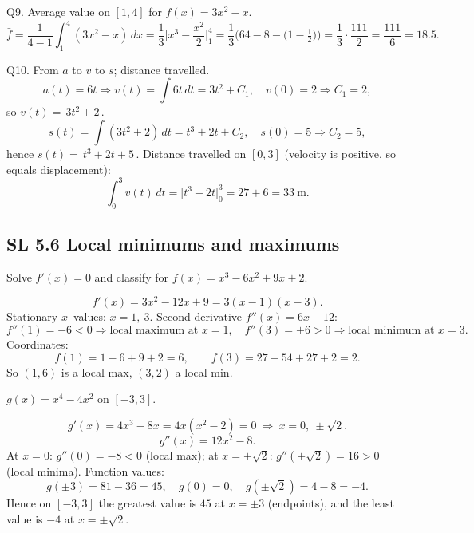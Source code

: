 \documentclass[11pt]{article}
\def\textbf#1{#1}%
\newcommand{\tocsubsection}[1]{\subsection{#1}}
\begin{document}
\begin{solution}
\textbf{Q9. Average value on $[1,4]$ for $f(x)=3x^{2}-x$.}
\[
\bar f=\frac{1}{4-1}\int_{1}^{4}(3x^{2}-x)\,dx
=\frac{1}{3}\Big[x^{3}-\frac{x^{2}}{2}\Big]_{1}^{4}
=\frac{1}{3}\Big(64-8-\big(1-\tfrac12\big)\Big)
=\frac{1}{3}\cdot\frac{111}{2}=\boxed{\frac{111}{6}}= \boxed{18.5}.
\]
\end{solution}

\begin{solution}
\textbf{Q10. From $a$ to $v$ to $s$; distance travelled.}
\[
a(t)=6t \Rightarrow v(t)=\int 6t\,dt=3t^{2}+C_1,\quad v(0)=2\Rightarrow C_1=2,
\]
so $v(t)=\boxed{\,3t^{2}+2\,}$.  
\[
s(t)=\int (3t^{2}+2)\,dt=t^{3}+2t+C_2,\quad s(0)=5\Rightarrow C_2=5,
\]
hence $s(t)=\boxed{\,t^{3}+2t+5\,}$.  
Distance travelled on $[0,3]$ (velocity is positive, so equals displacement):
\[
\int_{0}^{3} v(t)\,dt=\Big[t^{3}+2t\Big]_{0}^{3}=27+6=\boxed{33\ \text{m}}.
\]
\end{solution}



\tocsubsection{SL 5.6 Local minimums and maximums}


\begin{solution}
\textbf{Solve $f'(x)=0$ and classify for $f(x)=x^{3}-6x^{2}+9x+2$.}

\[
f'(x)=3x^{2}-12x+9=3(x-1)(x-3).
\]
Stationary $x$–values: $\boxed{x=1,\ 3}$.  
Second derivative $f''(x)=6x-12$:
\[
f''(1)=-6<0\Rightarrow \text{local maximum at }x=1,\quad
f''(3)=+6>0\Rightarrow \text{local minimum at }x=3.
\]
Coordinates:
\[
f(1)=1-6+9+2= \boxed{6},\qquad f(3)=27-54+27+2=\boxed{2}.
\]
So $(1,6)$ is a local max, $(3,2)$ a local min.
\end{solution}

\begin{solution}
\textbf{$g(x)=x^{4}-4x^{2}$ on $[-3,3]$.}

\[
g'(x)=4x^{3}-8x=4x(x^{2}-2)=0 \ \Rightarrow\  x=\boxed{0,\ \pm\sqrt2}.
\]
\[
g''(x)=12x^{2}-8.
\]
At $x=0$: $g''(0)=-8<0$ (local max); at $x=\pm\sqrt2$: $g''(\pm\sqrt2)=16>0$ (local minima).  
Function values:
\[
g(\pm3)=81-36=45,\quad g(0)=0,\quad g(\pm\sqrt2)=4-8=-4.
\]
Hence on $[-3,3]$ the greatest value is $\boxed{45}$ at $x=\pm3$ (endpoints), and the least value is $\boxed{-4}$ at $x=\pm\sqrt2$.
\end{solution}
\end{document}
